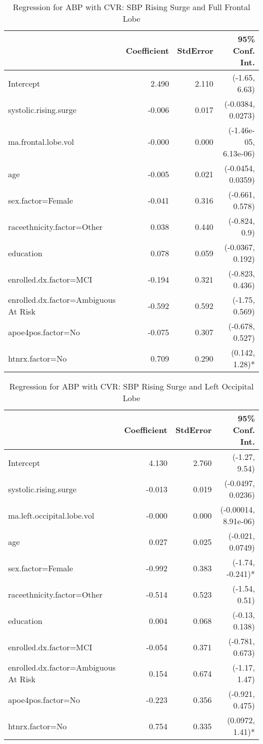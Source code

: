 \documentclass[10pt]{article}\usepackage[]{graphicx}\usepackage[]{color}
\begin{document}
\begin{table}[ht]
\centering
\caption{Regression for ABP with CVR: SBP Rising Surge and Full Frontal Lobe} 
\begin{tabular}{lrrr}
  \toprule
 & Coefficient & StdError & 95\% Conf. Int. \\ 
  \midrule
Intercept & 2.490 & 2.110 & (-1.65, 6.63) \\ 
  systolic.rising.surge & -0.006 & 0.017 & (-0.0384, 0.0273) \\ 
  ma.frontal.lobe.vol & -0.000 & 0.000 & (-1.46e-05, 6.13e-06) \\ 
  age & -0.005 & 0.021 & (-0.0454, 0.0359) \\ 
  sex.factor=Female & -0.041 & 0.316 & (-0.661, 0.578) \\ 
  raceethnicity.factor=Other & 0.038 & 0.440 & (-0.824, 0.9) \\ 
  education & 0.078 & 0.059 & (-0.0367, 0.192) \\ 
  enrolled.dx.factor=MCI & -0.194 & 0.321 & (-0.823, 0.436) \\ 
  enrolled.dx.factor=Ambiguous At Risk & -0.592 & 0.592 & (-1.75, 0.569) \\ 
  apoe4pos.factor=No & -0.075 & 0.307 & (-0.678, 0.527) \\ 
  htnrx.factor=No & 0.709 & 0.290 & (0.142, 1.28)* \\ 
   \bottomrule
\end{tabular}
\end{table}
\begin{table}[ht]
\centering
\caption{Regression for ABP with CVR: SBP Rising Surge and Left Occipital Lobe} 
\begin{tabular}{lrrr}
  \toprule
 & Coefficient & StdError & 95\% Conf. Int. \\ 
  \midrule
Intercept & 4.130 & 2.760 & (-1.27, 9.54) \\ 
  systolic.rising.surge & -0.013 & 0.019 & (-0.0497, 0.0236) \\ 
  ma.left.occipital.lobe.vol & -0.000 & 0.000 & (-0.00014, 8.91e-06) \\ 
  age & 0.027 & 0.025 & (-0.021, 0.0749) \\ 
  sex.factor=Female & -0.992 & 0.383 & (-1.74, -0.241)* \\ 
  raceethnicity.factor=Other & -0.514 & 0.523 & (-1.54, 0.51) \\ 
  education & 0.004 & 0.068 & (-0.13, 0.138) \\ 
  enrolled.dx.factor=MCI & -0.054 & 0.371 & (-0.781, 0.673) \\ 
  enrolled.dx.factor=Ambiguous At Risk & 0.154 & 0.674 & (-1.17, 1.47) \\ 
  apoe4pos.factor=No & -0.223 & 0.356 & (-0.921, 0.475) \\ 
  htnrx.factor=No & 0.754 & 0.335 & (0.0972, 1.41)* \\ 
   \bottomrule
\end{tabular}
\end{table}
\end{document}
